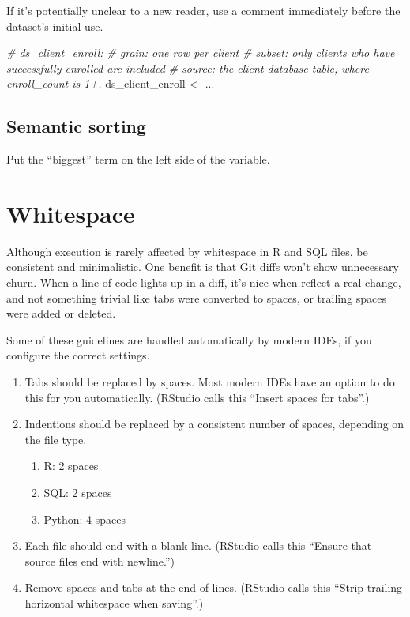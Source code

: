 \documentclass[
]{book}
\newenvironment{Shaded}{\begin{snugshade}}{\end{snugshade}}
\newcommand{\CommentTok}[1]{\textcolor[rgb]{0.56,0.35,0.01}{\textit{#1}}}
\newcommand{\NormalTok}[1]{#1}
\newcommand{\StringTok}[1]{\textcolor[rgb]{0.31,0.60,0.02}{#1}}
\providecommand{\tightlist}{%
  \setlength{\itemsep}{0pt}\setlength{\parskip}{0pt}}
\begin{document}
If it's potentially unclear to a new reader, use a comment immediately before the dataset's initial use.

\begin{Shaded}
\begin{Highlighting}[]
\CommentTok{\# \textasciigrave{}ds\_client\_enroll\textasciigrave{}:}
\CommentTok{\#    grain: one row per client}
\CommentTok{\#    subset: only clients who have successfully enrolled are included}
\CommentTok{\#    source: the \textasciigrave{}client\textasciigrave{} database table, where \textasciigrave{}enroll\_count\textasciigrave{} is 1+.}
\NormalTok{ds\_client\_enroll \textless{}{-}}\StringTok{ }\NormalTok{...}
\end{Highlighting}
\end{Shaded}

\hypertarget{style-naming-semantic}{%
\subsection{Semantic sorting}\label{style-naming-semantic}}

Put the ``biggest'' term on the left side of the variable.

\hypertarget{style-whitespace}{%
\section{Whitespace}\label{style-whitespace}}

Although execution is rarely affected by whitespace in R and SQL files, be consistent and minimalistic. One benefit is that Git diffs won't show unnecessary churn. When a line of code lights up in a diff, it's nice when reflect a real change, and not something trivial like tabs were converted to spaces, or trailing spaces were added or deleted.

Some of these guidelines are handled automatically by modern IDEs, if you configure the correct settings.

\begin{enumerate}
\def\labelenumi{\arabic{enumi}.}
\tightlist
\item
  Tabs should be replaced by spaces. Most modern IDEs have an option to do this for you automatically. (RStudio calls this ``Insert spaces for tabs''.)
\item
  Indentions should be replaced by a consistent number of spaces, depending on the file type.

  \begin{enumerate}
  \def\labelenumii{\arabic{enumii}.}
  \tightlist
  \item
    R: 2 spaces
  \item
    SQL: 2 spaces
  \item
    Python: 4 spaces
  \end{enumerate}
\item
  Each file should end \href{https://unix.stackexchange.com/a/18746/104659}{with a blank line}. (RStudio calls this ``Ensure that source files end with newline.'')
\item
  Remove spaces and tabs at the end of lines. (RStudio calls this ``Strip trailing horizontal whitespace when saving''.)
\end{enumerate}
\end{document}

